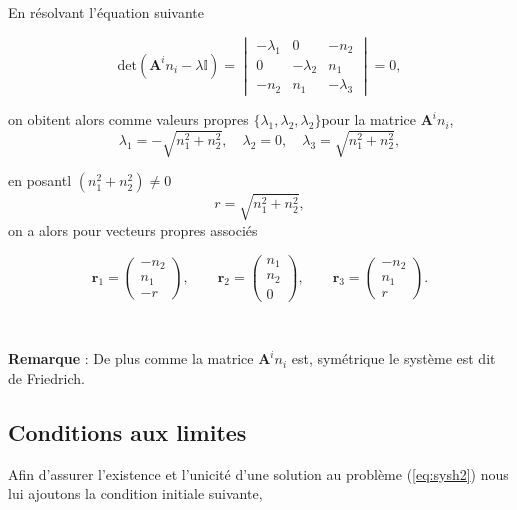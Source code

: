 \documentclass[a4paper,oneside,10pt]{report}
\begin{document}
En résolvant l'équation suivante

\begin{equation}
\mbox{det} (\mathbf{A}^i n_i - \lambda\mathbb{I}) =
\begin{vmatrix}
-\lambda_1 & 0 & -n_2\\
0 & -\lambda_2 & n_1\\
-n_2 & n_1 & -\lambda_3
\end{vmatrix}
=0,
\end{equation}

on obitent alors comme valeurs propres $\{\lambda_1,\lambda_2,\lambda_2\}$pour la matrice $\mathbf{A}^i n_i$, 
\begin{equation}
\label{eq:vp}
\lambda_1 = -\sqrt{n_1^2 + n_2^2},\quad \lambda_2 =0,\quad \lambda_3 = \sqrt{n_1^2 + n_2^2},
\end{equation}

en posantl $(n_1^2 + n_2^2) \neq 0 $ 
$$r=\sqrt{n_1^2 + n_2^2},$$
on a alors pour vecteurs propres associés

\begin{equation}
\mathbf{r}_{1}=
\begin{pmatrix}
-n_2\\
n_1\\
-r
\end{pmatrix},
\qquad
\mathbf{r}_2=
\begin{pmatrix}
n_1\\
n_2\\
0
\end{pmatrix},
\qquad
\mathbf{r}_{3}=
\begin{pmatrix}
-n_2\\
n_1\\
r
\end{pmatrix}.
\end{equation}
\begin{center}
\\
\end{center}
\textbf{Remarque} : De plus comme la matrice $\mathbf{A}^in_i $ est, symétrique le système est dit de Friedrich.\\


\subsection{Conditions aux limites}

Afin d'assurer l'existence et l'unicité d'une solution au problème (\ref{eq:sysh2}) nous lui ajoutons la condition initiale suivante,
\end{document}
